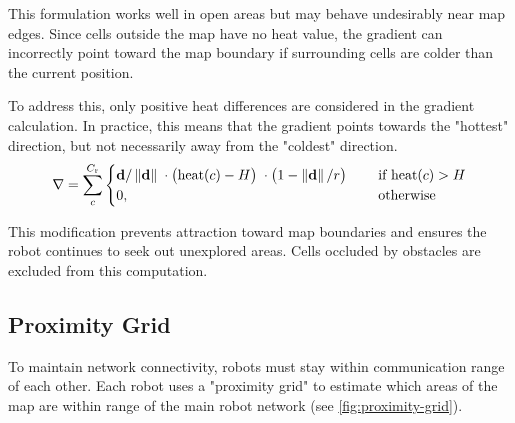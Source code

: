 This formulation works well in open areas but may behave undesirably near map edges. Since cells outside the map have no heat value, the gradient can incorrectly point toward the map boundary if surrounding cells are colder than the current position. 


To address this, only positive heat differences are considered in the gradient calculation. In practice, this means that the gradient points towards the "hottest" direction, but not necessarily away from the "coldest" direction.
\begin{equation}
\label{eq:robot-gradient}
    \nabla = \sum_c^{C_\mathrm{r}}
    \begin{cases}
        \mathbf{d}/\left\lVert\mathbf{d}\right\rVert      \; \cdot
        \big(\mathrm{heat}(c) - H\big)    \; \cdot
        \big(1 - \left\lVert\mathbf{d}\right\rVert/r\big) \; \quad &\text{if } \mathrm{heat}(c) > H
        \\
        0, \quad &\text{otherwise}
    \end{cases}
\end{equation}

This modification prevents attraction toward map boundaries and ensures the robot continues to seek out unexplored areas. Cells occluded by obstacles are excluded from this computation.


\subsection{Proximity Grid}
To maintain network connectivity, robots must stay within communication range of each other. Each robot uses a "proximity grid" to estimate which areas of the map are within range of the main robot network (see \cref{fig:proximity-grid}).

